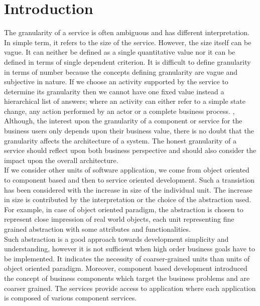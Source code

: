 \section{Introduction}\label{section:granularity/introduction}
The granularity of a service is often ambiguous and has different interpretation. In simple term, it refers to the size of the service. However, the size itself can be vague. It can neither be defined as a single quantitative value nor it can be defined in terms of single dependent criterion. It is difficult to define granularity in terms of number because the concepts defining granularity are vague and subjective in nature. If we choose an activity supported by the service to determine its granularity then we cannot have one fixed value instead a hierarchical list of answers; where an activity can either refer to a simple state change, any action performed by an actor or a complete business process. \cite{Linthicum:2015aa}, \cite{Raf-Haesen:2015aa}
\\
Although, the interest upon the granularity of a component or service for the business users only depends upon their business value, there is no doubt that the granularity affects the architecture of a system. The honest granularity of a service should reflect upon both business perspective and should also consider the impact upon the overall architecture.
\\
If we consider other units of software application, we come from object oriented to component based and then to service oriented development. Such a transistion has been considered with the increase in size of the individual unit. The increase in size is contributed by the interpretation or the choice of the abstraction used. For example, in case of object oriented paradigm, the abstraction is chosen to represent close impression of real world objects, each unit representing fine grained abstraction with some attributes and functionalities. 
\\
Such abstraction is a good approach towards development simplicity and understanding, however it is not sufficient when high order business goals have to be implemented. It indicates the necessity of coarser-grained units than units of object oriented paradigm. Moreover, component based development introduced the concept of business components which target the business problems and are coarser grained. The services provide access to application where each application is composed of various component services. \cite{Linthicum:2015aa}


